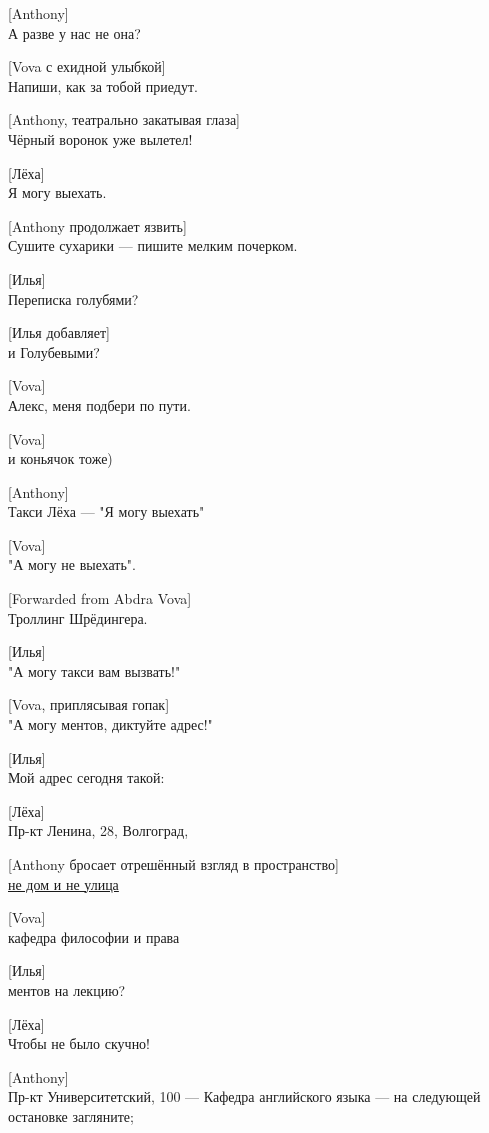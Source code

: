 [Anthony]\\
А разве у нас не она?


[Vova с ехидной улыбкой]\\
Напиши, как за тобой приедут.


[Anthony, театрально закатывая глаза]\\
Чёрный воронок уже вылетел!


[Лёха]\\
Я могу выехать.


[Anthony продолжает язвить]\\
Сушите сухарики --- пишите мелким почерком.


[Илья]\\
Переписка голубями?


[Илья добавляет]\\
и Голубевыми?


[Vova]\\
Алекс, меня подбери по пути.


[Vova]\\
и коньячок тоже)


[Anthony]\\
Такси Лёха --- "Я могу выехать"


[Vova]\\
"А могу не выехать".


[Forwarded from Abdra Vova]\\
Троллинг Шрёдингера.


[Илья]\\
"А могу такси вам вызвать!"


[Vova, приплясывая гопак]\\
"А могу ментов, диктуйте адрес!"


[Илья]\\
Мой адрес сегодня такой:


[Лёха]\\
Пр-кт Ленина, 28, Волгоград,


[Anthony бросает отрешённый взгляд в пространство]\\
\href{http://pine-forum.herokuapp.com/}{не дом и не улица}


[Vova]\\
кафедра философии и права


[Илья]\\ 
ментов на лекцию?


[Лёха]\\
Чтобы не было скучно!


[Anthony]\\
Пр-кт Университетский, 100 --- Кафедра английского языка --- на следующей остановке загляните;


